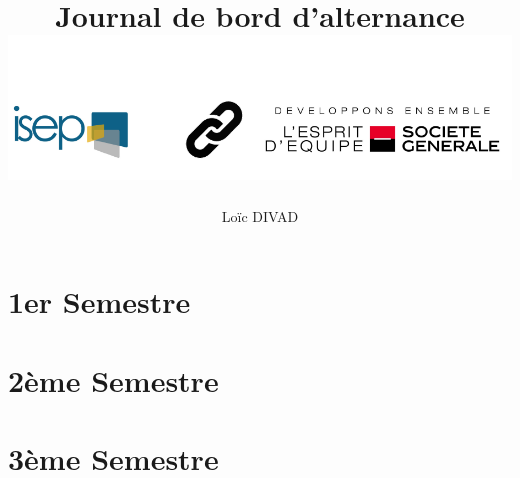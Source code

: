 \documentclass{article}
\title{\textbf{Journal de bord d'alternance} \\ \includegraphics[scale=0.4]{isep-sg.png}
\\ \flushleft{-- Journal n°3 --}}
\author{Loïc DIVAD}
\begin{document}
\maketitle \newpage

\section*{1er Semestre}



\newpage

\section*{2ème Semestre}



\newpage

\section*{3ème Semestre}



\printindex
\end{document}
